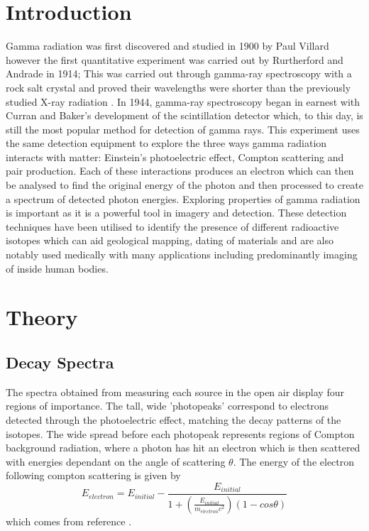 \documentclass[11pt]{article} %
\newcommand{\citet}{\cite} %
\begin{document}
\newpage %

\section{Introduction} 
\label{intro}
    Gamma radiation was first discovered and studied in 1900 by Paul Villard \cite{GammaRadiation} however the first quantitative experiment was carried out by Rurtherford and Andrade in 1914; This was carried out through gamma-ray spectroscopy with a rock salt crystal and proved their wavelengths were shorter than the previously studied X-ray radiation \cite{GammaRadiation2}. In 1944, gamma-ray spectroscopy began in earnest with Curran and Baker’s development of the scintillation detector \cite{SD} which, to this day, is still the most popular method for detection of gamma rays. This experiment uses the same detection equipment to explore the three ways gamma radiation interacts with matter: Einstein’s photoelectric effect, Compton scattering and pair production. Each of these interactions produces an electron which can then be analysed to find the original energy of the photon and then processed to create a spectrum of detected photon energies. Exploring properties of gamma radiation is important as it is a powerful tool in imagery and detection. These detection techniques have been utilised to identify the presence of different radioactive isotopes which can aid geological mapping, dating of materials and are also notably used medically with many applications including predominantly imaging of inside human bodies.

\section{Theory}
    \subsection{Decay Spectra}
        The spectra obtained from measuring each source in the open air display four regions of importance. The tall, wide 'photopeaks' correspond to electrons detected through the photoelectric effect, matching the decay patterns of the isotopes. The wide spread before each photopeak represents regions of Compton background radiation, where a photon has hit an electron which is then scattered with energies dependant on the angle of scattering $\theta$. The energy of the electron following compton scattering is given by
        \begin{equation}\label{compton}
            E_{electron} = E_{initial}-\frac{E_{initial}}{1+(\frac{E_{initial}}{m_{electron}c^{2}})(1-cos\theta)}
        \end{equation}
        which comes from reference \citet{compton}.
\end{document}
